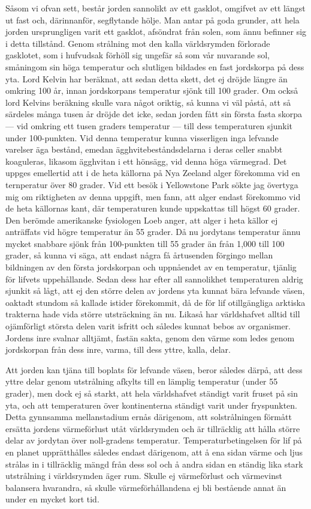 \documentclass[a4paper, 12pt, oneside, swedish]{article}
\begin{document}
Såsom vi ofvan sett, består jorden sannolikt av ett gasklot, omgifvet av ett längst ut fast och, därinnanför, segflytande hölje. Man antar på goda grunder, att hela jorden ursprungligen varit ett gasklot, afsöndrat från solen, som ännu befinner sig i detta tillstånd. Genom strålning mot den kalla världsrymden förlorade gasklotet, som i hufvudsak förhöll sig ungefär så som vår nuvarande sol, småningom sin höga temperatur och slutligen bildades en fast jordskorpa på dess yta. Lord Kelvin har beräknat, att sedan detta skett, det ej dröjde längre än omkring 100 år, innan jordskorpans temperatur sjönk till 100 grader. Om också lord Kelvins beräkning skulle vara något oriktig, så kunna vi väl påstå, att så särdeles många tusen år dröjde det icke, sedan jorden fått sin första fasta skorpa --- vid omkring ett tusen graders temperatur --- till dess temperaturen sjunkit under 100-punkten. Vid denna temperatur kunna visserligen inga lefvande varelser äga bestånd, emedan ägghvitebeståndsdelarna i deras celler snabbt koaguleras, likasom ägghvitan i ett hönsägg, vid denna höga värmegrad. Det uppges emellertid att i de heta källorna på Nya Zeeland alger förekomma vid en ternperatur över 80 grader. Vid ett besök i Yellowstone Park sökte jag övertyga mig om riktigheten av denna uppgift, men fann, att alger endast förekommo vid de heta källornas kant, där temperaturen kunde uppskattas till högst 60 grader. Den berömde amerikanske fysiologen Loeb anger, att alger i heta källor ej anträffats vid högre temperatur än 55 grader. Då nu jordytans temperatur ännu mycket snabbare sjönk från 100-punkten till 55 grader än från 1,000 till 100 grader, så kunna vi säga, att endast några få årtusenden förgingo mellan bildningen av den första jordskorpan och uppnåendet av en temperatur, tjänlig för lifvets uppehållande. Sedan dess har efter all sannolikhet temperaturen aldrig sjunkit så lågt, att ej den större delen av jordens yta kunnat bära lefvande väsen, oaktadt stundom så kallade istider förekommit, då de för lif otillgängliga arktiska trakterna hade vida större utsträckning än nu. Likaså har världshafvet alltid till ojämförligt största delen varit isfritt och således kunnat bebos av organismer. Jordens inre svalnar alltjämt, fastän sakta, genom den värme som ledes genom jordskorpan från dess inre, varma, till dess yttre, kalla, delar.

Att jorden kan tjäna till boplats för lefvande väsen, beror således därpå, att dess yttre delar genom utstrålning afkylts till en lämplig temperatur (under 55 grader), men dock ej så starkt, att hela världshafvet ständigt varit fruset på sin yta, och att temperaturen över kontinenterna ständigt varit under fryspunkten. Detta gynnsamma mellanstadium ernås därigenom, att solstrålningen förmått ersätta jordens värmeförlust utåt världsrymden och är tillräcklig att hålla större delar av jordytan över noll-gradens temperatur. Temperaturbetingelsen för lif på en planet upprätthålles således endast därigenom, att å ena sidan värme och ljus strålas in i tillräcklig mängd från dess sol och å andra sidan en ständig lika stark utstrålning i världsrymden äger rum. Skulle ej värmeförlust och värmevinst balansera hvarandra, så skulle värmeförhållandena ej bli bestående annat än under en mycket kort tid.
\end{document}
